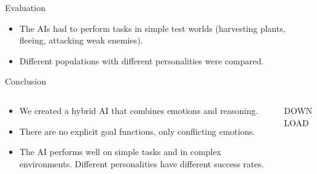 \documentclass[final,hyperref={pdfpagelabels=false}]{beamer}
\begin{document}
\begin{frame}
\begin{columns}[t]
\begin{column}{.45\textwidth}
            \begin{block}{Evaluation}
                \begin{itemize}
                    \item The AIs had to perform tasks in simple test worlds (harvesting plants, fleeing, attacking weak enemies).
                    \item Different populations with different personalities were compared.
                \end{itemize}
            \end{block}
            
            \begin{block}{Conclusion}
                \begin{columns}[t]
                    \begin{column}{0.77\textwidth}
                        \begin{itemize}
                            \item We created a hybrid AI that combines emotions and reasoning.
                            \item There are no explicit goal functions, only conflicting emotions.
                            \item The AI performs well on simple tasks and in complex environments. Different personalities have different success rates.
                        \end{itemize}
                    \end{column}
                    \begin{column}{0.23\textwidth}
                        \begin{block}{DOWNLOAD}
                            \begin{center}
                        \end{center}
                        \end{block}
                    \end{column}
                \end{columns}
            \end{block}
        \end{column}
    \end{columns}
\end{frame}
\end{document}
